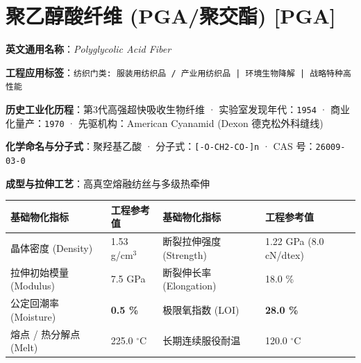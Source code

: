 \documentclass[11pt,openright,twoside,UTF8]{ctexbook}
\begin{document}
\section{聚乙醇酸纤维 (PGA/聚交酯) [PGA]}
\label{sec:pga}

\noindent\textbf{英文通用名称}：\textit{Polyglycolic Acid Fiber}\par
\noindent\textbf{工程应用标签}：\texttt{纺织门类: 服装用纺织品 / 产业用纺织品 | 环境生物降解 | 战略特种高性能}\par
\noindent\textbf{历史工业化历程}：第3代高强超快吸收生物纤维 · 实验室发现年代：\texttt{1954} · 商业化量产：\texttt{1970} · 先驱机构：American Cyanamid (Dexon 德克松外科缝线)\par
\noindent\textbf{化学命名与分子式}：聚羟基乙酸 · 分子式：\texttt{[-O-CH2-CO-]n} · CAS 号：\texttt{26009-03-0}\par
\noindent\textbf{成型与拉伸工艺}：高真空熔融纺丝与多级热牵伸\par

\vspace{0.15cm}
\begin{center}
\small
\begin{tabularx}{\textwidth}{p{3.8cm}Xp{3.8cm}X}
\toprule
\textbf{基础物化指标} & \textbf{工程参考值} & \textbf{基础物化指标} & \textbf{工程参考值} \\
\midrule
晶体密度 (Density) & 1.53 g/cm$^3$ & 断裂拉伸强度 (Strength) & 1.22 GPa (8.0 cN/dtex) \\
拉伸初始模量 (Modulus) & 7.5 GPa & 断裂伸长率 (Elongation) & 18.0 \% \\
公定回潮率 (Moisture) & \textbf{0.5 \%} & 极限氧指数 (LOI) & \textbf{28.0 \%} \\
熔点 / 热分解点 (Melt) & 225.0 $^\circ\mathrm{C}$ & 长期连续服役耐温 & 120.0 $^\circ\mathrm{C}$ \\
\bottomrule
\end{tabularx}
\end{center}
\vspace{0.15cm}
\end{document}
